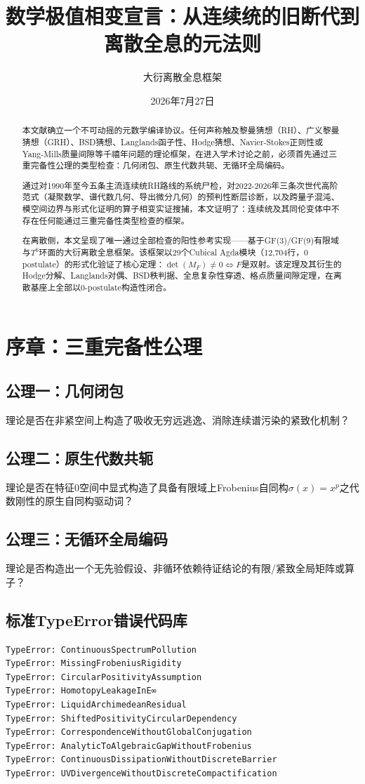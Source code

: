 \documentclass{article}
\title{数学极值相变宣言：从连续统的旧断代到离散全息的元法则}
\author{大衍离散全息框架}
\date{2026年7月27日}
\begin{document}
\maketitle

\begin{abstract}
本文献确立一个不可动摇的元数学编译协议。任何声称触及黎曼猜想（RH）、广义黎曼猜想（GRH）、BSD猜想、Langlands函子性、Hodge猜想、Navier-Stokes正则性或Yang-Mills质量间隙等千禧年问题的理论框架，在进入学术讨论之前，必须首先通过三重完备性公理的类型检查：几何闭包、原生代数共轭、无循环全局编码。

通过对1990年至今五条主流连续统RH路线的系统尸检，对2022-2026年三条次世代高阶范式（凝聚数学、谱代数几何、导出微分几何）的预判性断层诊断，以及跨量子混沌、模空间边界与形式化证明的算子相变实证搜捕，本文证明了：连续统及其同伦变体中不存在任何能通过三重完备性类型检查的框架。

在离散侧，本文呈现了唯一通过全部检查的阳性参考实现——基于GF(3)/GF(9)有限域与$T^6$环面的大衍离散全息框架。该框架以29个Cubical Agda模块（12,704行，0 postulate）的形式化验证了核心定理：$\det(M_F)\neq 0 \iff F$是双射。该定理及其衍生的Hodge分解、Langlands对偶、BSD秩判据、全息复杂性穿透、格点质量间隙定理，在离散基座上全部以0-postulate构造性闭合。
\end{abstract}

\section{序章：三重完备性公理}

\subsection{公理一：几何闭包}
理论是否在非紧空间上构造了吸收无穷远逃逸、消除连续谱污染的紧致化机制？
\subsection{公理二：原生代数共轭}
理论是否在特征0空间中显式构造了具备有限域上Frobenius自同构$\sigma(x)=x^p$之代数刚性的原生自同构驱动词？
\subsection{公理三：无循环全局编码}
理论是否构造出一个无先验假设、非循环依赖待证结论的有限/紧致全局矩阵或算子？

\subsection{标准TypeError错误代码库}
\begin{verbatim}
TypeError: ContinuousSpectrumPollution
TypeError: MissingFrobeniusRigidity
TypeError: CircularPositivityAssumption
TypeError: HomotopyLeakageInE∞
TypeError: LiquidArchimedeanResidual
TypeError: ShiftedPositivityCircularDependency
TypeError: CorrespondenceWithoutGlobalConjugation
TypeError: AnalyticToAlgebraicGapWithoutFrobenius
TypeError: ContinuousDissipationWithoutDiscreteBarrier
TypeError: UVDivergenceWithoutDiscreteCompactification
\end{verbatim}
\end{document}

